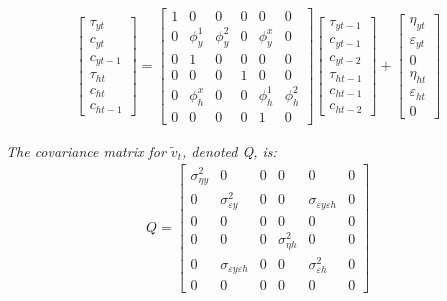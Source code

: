 \documentclass[12pt]{article}
\begin{document}
\begin{outline}[enumerate]
		\begin{align}
		\begin{bmatrix}
		\tau_{yt}	\\
		c_{yt}		\\
		c_{yt-1}		\\
		\tau_{ht}	\\
		c_{ht}		\\
		c_{ht-1}		
		\end{bmatrix}
		=
		\begin{bmatrix}
		1	& 0	& 0	& 0	& 0	& 0	\\
		0	& \phi^1_y	& \phi^2_y	& 0	& \phi^x_y	& 0	\\
		0	& 1	& 0	& 0 & 0 & 0  \\
		0	& 0	& 0	& 1	& 0	& 0 \\
		0	& \phi^x_h	& 0	& 0 &\phi^1_h	& \phi^2_h	\\
		0	& 0	& 0	& 0 & 1 & 0
		\end{bmatrix}
		\begin{bmatrix}
		\tau_{yt-1}	\\
		c_{yt-1}		\\
		c_{yt-2}		\\
		\tau_{ht-1}	\\
		c_{ht-1}		\\
		c_{ht-2}		
		\end{bmatrix}
		+
		\begin{bmatrix}
		\eta_{yt}	\\
		\varepsilon_{yt}		\\
		0	\\
		\eta_{ht}	\\
		\varepsilon_{ht}		\\
		0	
		\end{bmatrix}
		\end{align}
		
		\bigskip
		\textit{The covariance matrix for $\tilde{v}_t$, denoted Q, is: }
		\begin{align}
		Q = 
		\begin{bmatrix}
		\sigma^2_{\eta y}	& 0	 &0 & 0	& 0	& 0	\\
		0	& \sigma^2_{\varepsilon y}	& 0	& 0	& \sigma_{\varepsilon y \varepsilon h}	& 0	\\
		0	&	0	& 0 & 0 & 0 & 0	\\
		0	& 0	& 0	& \sigma^2_{\eta h}	& 0	& 0	\\
		0	& \sigma_{\varepsilon y \varepsilon h}	& 0	& 0	& \sigma^2_{\varepsilon h}		& 0	\\
		0	&0	& 0	& 0
		& 0	& 0
		\end{bmatrix}
		\end{align}
		

\end{outline}
\end{document}
